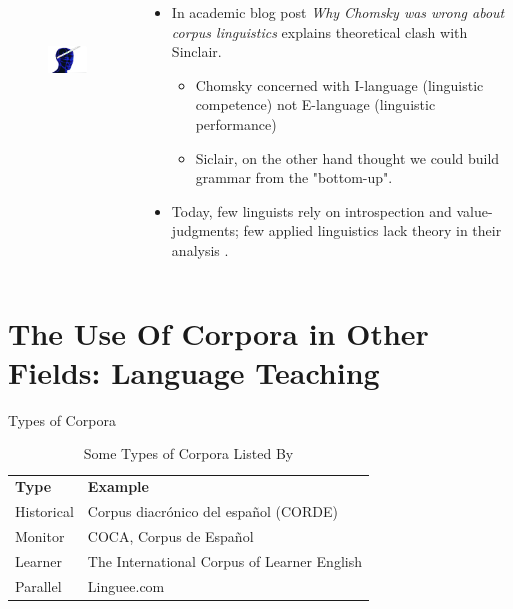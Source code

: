 \documentclass{beamer}
\begin{document}
\begin{frame}
\begin{columns}
\begin{column}{4cm}
\begin{figure}
\includegraphics[height=3cm]{phrasehead.jpg}
\end{figure}
\end{column}
\begin{column}{6cm}
\begin{itemize}
\item In academic blog post \textit{Why Chomsky was wrong about corpus linguistics}  explains theoretical clash with Sinclair.
\begin{itemize}
\item Chomsky concerned with I-language (linguistic competence) not E-language (linguistic performance)
\item Siclair, on the other hand thought we could build grammar from the "bottom-up". 
\end{itemize}
\item Today, few linguists rely on introspection and value-judgments; few applied linguistics lack theory in their analysis	.
\end{itemize}
\end{column}
\end{columns}
\end{frame}


\section{The Use Of Corpora in Other Fields: Language Teaching}

\begin{frame}{Types of Corpora}

\begin{table}
\centering
\caption{Some Types of Corpora Listed By }
\label{my-label}
\begin{tabular}{ll}
\textbf{Type} & \textbf{Example}  \\ 
	\pause
    Historical & Corpus diacrónico del español (CORDE)  \\
	\pause
    Monitor & COCA, Corpus de Español  \\
	\pause
    Learner & The International Corpus of Learner English  \\
	\pause
    Parallel & Linguee.com 
\end{tabular}
\end{table}
\end{frame}
\end{document}
